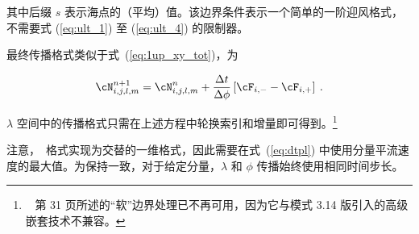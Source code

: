 \noindent
其中后缀 $s$ 表示海点的（平均）值。该边界条件表示一个简单的一阶迎风格式，不需要式 (\ref{eq:ult_1}) 至 (\ref{eq:ult_4}) 的限制器。

最终传播格式类似于式~(\ref{eq:1up_xy_tot})，为


\begin{equation}
\cN_{i,j,l,m}^{n+1} = \cN_{i,j,l,m}^n +
\frac{\Delta t}{\Delta \phi} \left [ \cF_{i,-} - \cF_{i,+} \right ]
\: . \label{eq:uq_xy_tot} \end{equation}

\noindent
$\lambda$ 空间中的传播格式只需在上述方程中轮换索引和增量即可得到。\footnote{~\cite{tol:OMB02c} 第 31 页所述的“软”边界处理已不再可用，因为它与模式 3.14 版引入的高级嵌套技术不兼容。}

注意，\uq\ 格式实现为交替的一维格式，因此需要在式~(\ref{eq:dtpl}) 中使用分量平流速度的最大值。为保持一致，对于给定分量，$\lambda$ 和 $\phi$ 传播始终使用相同时间步长。
